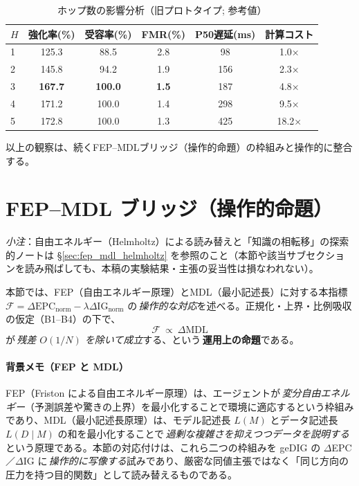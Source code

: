 \documentclass[ja=standard,xelatex]{bxjsarticle}
\newcommand{\F}{\mathcal{F}}
\newcommand{\gednorm}{\Delta\mathrm{EPC}_{\mathrm{norm}}}
\newcommand{\ignorm}{\Delta\mathrm{IG}_{\mathrm{norm}}}
\begin{document}
\begin{table}[H]
\centering
\caption{ホップ数の影響分析（旧プロトタイプ; 参考値）}
\label{tab:hop_sensitivity}
\begin{tabular}{lccccc}
\toprule
$H$ & 強化率(\%) & 受容率(\%) & FMR(\%) & P50遅延(ms) & 計算コスト \\
\midrule
1 & 125.3 & 88.5 & 2.8 & 98 & 1.0× \\
2 & 145.8 & 94.2 & 1.9 & 156 & 2.3× \\
3 & \textbf{167.7} & \textbf{100.0} & \textbf{1.5} & 187 & 4.8× \\
4 & 171.2 & 100.0 & 1.4 & 298 & 9.5× \\
5 & 172.8 & 100.0 & 1.3 & 425 & 18.2× \\
\bottomrule
\end{tabular}
\end{table}

\noindent 以上の観察は、続くFEP–MDLブリッジ（操作的命題）の枠組みと操作的に整合する。

\section{FEP–MDL ブリッジ（操作的命題）}
\label{sec:fep_mdl_bridge}
\noindent\textit{小注}：自由エネルギー（Helmholtz）による読み替えと「知識の相転移」の探索的ノートは \S\ref{sec:fep_mdl_helmholtz} を参照のこと（本節や該当サブセクションを読み飛ばしても、本稿の実験結果・主張の妥当性は損なわれない）。

本節では、FEP（自由エネルギー原理）とMDL（最小記述長）に対する本指標 $\F=\gednorm-\lambda\ignorm$ の\,\emph{操作的な対応}を述べる。正規化・上界・比例吸収の仮定（B1–B4）の下で、
\[\;\F\ \propto\ \Delta\mathrm{MDL}\;\]
が\,\emph{残差 $O(1/N)$ を除いて成立}する、という\,\textbf{運用上の命題}である。

\paragraph{背景メモ（FEP と MDL）}\;
FEP（Friston による自由エネルギー原理）は、エージェントが\,\emph{変分自由エネルギー}（予測誤差や驚きの上界）を最小化することで環境に適応するという枠組みであり、MDL（最小記述長原理）は、モデル記述長 $L(M)$ とデータ記述長 $L(D\mid M)$ の和を最小化することで\,\emph{過剰な複雑さを抑えつつデータを説明する}という原理である。本節の対応付けは、これら二つの枠組みを geDIG の $\Delta$EPC／$\Delta$IG に\,\emph{操作的に写像する}試みであり、厳密な同値主張ではなく「同じ方向の圧力を持つ目的関数」として読み替えるものである。
\end{document}
